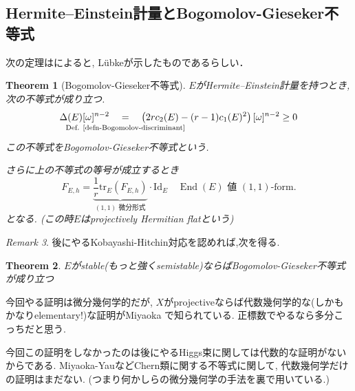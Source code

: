 \documentclass[dvipdfmx,a4paper,11pt]{article} %
\newtheorem{thm}{Theorem}[section]
\theoremstyle{definition}
\theoremstyle{remark}
\newtheorem{rem}[thm]{Remark}
\numberwithin{equation}{section}
\newcommand{\End}[0]{\operatorname{End}}
\newcommand{\underalign}[2]{\quad \underset{\mathclap{\strut #1}}{#2}\quad}
\begin{document}
\subsection{Hermite--Einstein計量とBogomolov-Gieseker不等式}
次の定理は\cite{Kob14}によると, L\"ubkeが示したものであるらしい．
\begin{thm}[Bogomolov-Gieseker不等式]
\label{thm-BG-inequality}
$E$がHermite--Einstein計量を持つとき, 次の不等式が成り立つ. 
$$
\Delta(E) [\omega]^{n-2}
\underalign{\text{Def. \ref{defn-Bogomolov-discriminant}}}{=}
\left(2r c_2(E)-(r-1)c_1(E)^2\right)[\omega]^{n-2}
\ge 0
$$
この不等式をBogomolov-Gieseker不等式という.

さらに上の不等式の等号が成立するとき
$$
F_{E,h} = \underbrace{\frac{1}{r} \mathrm{tr}_{E}(F_{E,h})}_{\text{\((1,1)\) 微分形式}}\cdot \mathrm{Id}_{E}
\quad \text{\(\End(E)\) 値 \((1,1)\)-form}.
$$
となる. (この時$E$はprojectively Hermitian flatという)
\end{thm}
\begin{rem}
後にやるKobayashi-Hitchin対応を認めれば,次を得る.
\begin{thm}
$E$がstable(もっと強くsemistable)ならばBogomolov-Gieseker不等式が成り立つ
\end{thm}
今回やる証明は微分幾何学的だが, $X$がprojectiveならば代数幾何学的な(しかもかなりelementary!)な証明がMiyaoka \cite{Miy87}で知られている.
正標数でやるなら多分こっちだと思う. 

今回この証明をしなかったのは後にやるHiggs束に関しては代数的な証明がないからである. 
Miyaoka-YauなどChern類に関する不等式に関して, 代数幾何学だけの証明はまだない. (つまり何かしらの微分幾何学の手法を裏で用いている.)
\end{rem}
\end{document}
